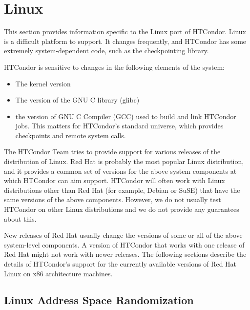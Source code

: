 \section{Linux}\label{sec:platform-linux}

This section provides information specific to the Linux port of
HTCondor.
Linux is a difficult platform to support.
It changes frequently, and HTCondor has some extremely
system-dependent code, such as the checkpointing library.

HTCondor is sensitive to changes in the following elements of the
system: 
\begin{itemize}
\item The kernel version
\item The version of the GNU C library (glibc)
\item the version of GNU C Compiler (GCC) used to build and link
  HTCondor jobs. This matters for HTCondor's standard universe, which
  provides checkpoints and remote system calls.
\end{itemize}

The HTCondor Team tries to provide support for various releases of the
distribution of Linux.
Red Hat is probably the most popular Linux distribution, and it
provides a common set of versions for the above system components
at which HTCondor can aim support.
HTCondor will often work with Linux distributions other than Red Hat (for
example, Debian or SuSE) that have the same versions of the above
components.
However, we do not usually test HTCondor on other Linux distributions
and we do not provide any guarantees about this.

New releases of Red Hat usually change the versions of some or all of
the above system-level components.
A version of HTCondor that works with one release of Red Hat might not
work with newer releases.
The following sections describe the details of HTCondor's support for
the currently available versions of Red Hat Linux on x86 architecture
machines.

\subsection{\label{sec:platform-linux-addrspace-random}Linux Address Space Randomization}

